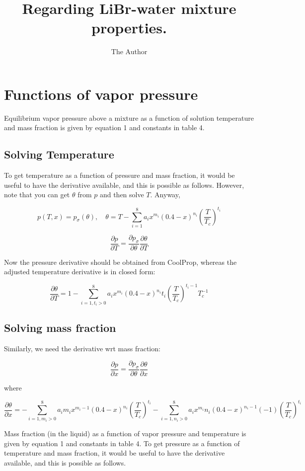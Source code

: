\documentclass[11pt]{article} %
\title{Regarding LiBr-water mixture properties.}
\author{The Author}
\begin{document}
\maketitle

\section{Functions of vapor pressure}

Equilibrium vapor pressure above a mixture as a function of solution temperature and mass fraction is given by equation 1 and constants in table 4.

\subsection{Solving Temperature}
To get temperature as a function of pressure and mass fraction, it would be useful to have the derivative available, and this is possible as follows. However, note that you can get \(\theta\) from \(p\) and then solve \(T\). Anyway,

\[
p(T,x) = p_{\sigma}(\theta), \quad
\theta = T - \sum_{i=1}^{8} a_i x^{m_i} (0.4 - x) ^ {n_i} \left(\frac{T}{T_c}\right)^{t_i}
\]

\[
\frac{\partial p}{\partial T} = 
\frac{\partial p_{\sigma}}{\partial \theta}
\frac{\partial \theta}{\partial T} 
\]

Now the pressure derivative should be obtained from CoolProp, whereas the adjusted temperature derivative is in closed form:

\[
\frac{\partial \theta}{\partial T}
=
1 - \sum_{i=1, t_i > 0}^{8} a_i x^{m_i} (0.4 - x) ^ {n_i} t_i \left(\frac{T}{T_c}\right)^{t_i - 1} T_c^{-1}
\]

\subsection{Solving mass fraction}

Similarly, we need the derivative wrt mass fraction:

\[
\frac{\partial p}{\partial x} = 
\frac{\partial p_{\sigma}}{\partial \theta}
\frac{\partial \theta}{\partial x} 
\]

where

\[
\frac{\partial \theta}{\partial x}
=
-\sum_{i=1, m_i > 0}^{8} a_i m_i x^{m_i-1} (0.4 - x) ^ {n_i} \left(\frac{T}{T_c}\right)^{t_i}
-\sum_{i=1, n_i > 0}^{8} a_i x^{m_i} n_i (0.4 - x) ^ {n_i - 1} (-1) \left(\frac{T}{T_c}\right)^{t_i}
\]




Mass fraction (in the liquid) as a function of vapor pressure and temperature is given by equation 1 and constants in table 4. To get pressure as a function of temperature and mass fraction, it would be useful to have the derivative available, and this is possible as follows.
\end{document}
